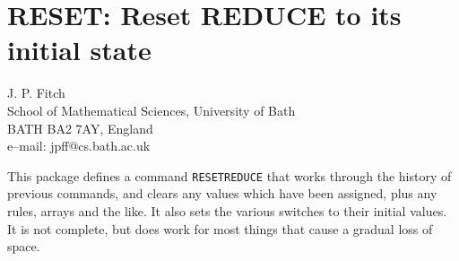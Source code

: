 \chapter{RESET: Reset REDUCE to its initial state}
\label{RESET}

{\footnotesize
\begin{center}
J. P. Fitch \\
School of Mathematical Sciences, University of Bath\\
BATH BA2 7AY, England \\[0.05in]
e--mail: jpff@cs.bath.ac.uk
\end{center}
}

This package defines a command {\tt RESETREDUCE}
 that works through the history of previous
commands, and clears any values which have been assigned, plus any
rules, arrays and the like.  It also sets the various switches to
their initial values.  It is not complete, but does work for most
things that cause a gradual loss of space.

